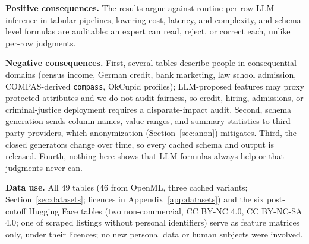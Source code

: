 \textbf{Positive consequences.} The results argue against routine per-row LLM inference in tabular pipelines, lowering cost, latency, and complexity, and schema-level formulas are auditable: an expert can read, reject, or correct each, unlike per-row judgments.

\textbf{Negative consequences.} First, several tables describe people in consequential domains (census income, German credit, bank marketing, law school admission, COMPAS-derived \texttt{compass}, OkCupid profiles); LLM-proposed features may proxy protected attributes and we do not audit fairness, so credit, hiring, admissions, or criminal-justice deployment requires a disparate-impact audit. Second, schema generation sends column names, value ranges, and summary statistics to third-party providers, which anonymization (Section~\ref{sec:anon}) mitigates. Third, the closed generators change over time, so every cached schema and output is released. Fourth, nothing here shows that LLM formulas always help or that judgments never can.

\textbf{Data use.} All 49 tables (46 from OpenML, three cached variants; Section~\ref{sec:datasets}; licences in Appendix~\ref{app:datasets}) and the six post-cutoff Hugging Face tables (two non-commercial, CC BY-NC 4.0, CC BY-NC-SA 4.0; one of scraped listings without personal identifiers) serve as feature matrices only, under their licences; no new personal data or human subjects were involved.
